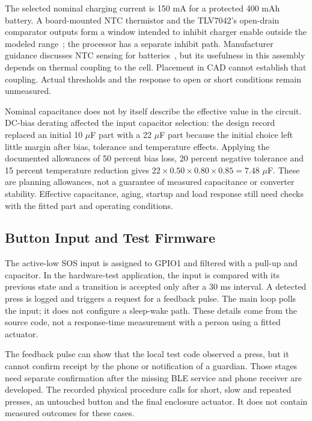 \documentclass[nolineno]{ieeeaccess}
\begin{document}
The selected nominal charging current is 150 mA for a protected 400 mAh battery. A board-mounted NTC thermistor and the TLV7042's open-drain comparator outputs form a window intended to inhibit charger enable outside the modeled range~\cite{comparator}; the processor has a separate inhibit path. Manufacturer guidance discusses NTC sensing for batteries~\cite{ntcapplication}, but its usefulness in this assembly depends on thermal coupling to the cell. Placement in CAD cannot establish that coupling. Actual thresholds and the response to open or short conditions remain unmeasured.

Nominal capacitance does not by itself describe the effective value in the circuit. DC-bias derating affected the input capacitor selection: the design record replaced an initial 10 \(\mu\)F part with a 22 \(\mu\)F part because the initial choice left little margin after bias, tolerance and temperature effects. Applying the documented allowances of 50 percent bias loss, 20 percent negative tolerance and 15 percent temperature reduction gives \(22\times0.50\times0.80\times0.85=7.48\) \(\mu\)F. These are planning allowances, not a guarantee of measured capacitance or converter stability. Effective capacitance, aging, startup and load response still need checks with the fitted part and operating conditions.


\subsection{Button Input and Test Firmware}
The active-low SOS input is assigned to GPIO1 and filtered with a pull-up and capacitor. In the hardware-test application, the input is compared with its previous state and a transition is accepted only after a 30 ms interval. A detected press is logged and triggers a request for a feedback pulse. The main loop polls the input; it does not configure a sleep-wake path. These details come from the source code, not a response-time measurement with a person using a fitted actuator.

The feedback pulse can show that the local test code observed a press, but it cannot confirm receipt by the phone or notification of a guardian. Those stages need separate confirmation after the missing BLE service and phone receiver are developed. The recorded physical procedure calls for short, slow and repeated presses, an untouched button and the final enclosure actuator. It does not contain measured outcomes for these cases.
\end{document}
